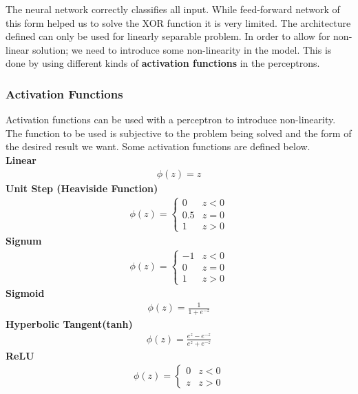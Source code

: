 The neural network correctly classifies all input. While feed-forward network of this form helped us to solve the XOR function it is very limited. The architecture defined can only be used for linearly separable problem. In order to allow for non-linear solution; we need to introduce some non-linearity in the model. This is done by using different kinds of \textbf{activation functions} in the perceptrons.
\subsubsection{Activation Functions}
Activation functions can be used with a perceptron to introduce non-linearity. The function to be used is subjective to the problem being solved and the form of the desired result we want. Some activation functions are defined below.\\
\textbf{Linear}
\begin{align}
  \phi(z) = z
\end{align}
\textbf{Unit Step (Heaviside Function)}
\begin{align}
  \phi(z) = \begin{cases}
    0 & z<0 \\
    0.5 & z=0 \\
    1 & z>0
  \end{cases}
\end{align}
\textbf{Signum}
\begin{align}
  \phi(z) = \begin{cases}
    -1 & z<0 \\
    0 & z=0 \\
    1 & z>0
  \end{cases}
\end{align}
\textbf{Sigmoid}
\begin{align}
  \phi(z) = \frac{1}{1+ e^{-z}}
\end{align}
\textbf{Hyperbolic Tangent(tanh)}
\begin{align}
  \phi(z) = \frac{e^z - e^{-z}}{e^z + e^{-z}}
\end{align}
\textbf{ReLU}
\begin{align}
  \phi(z) = \begin{cases}
    0 & z<0 \\
    z & z>0
  \end{cases}
\end{align}
